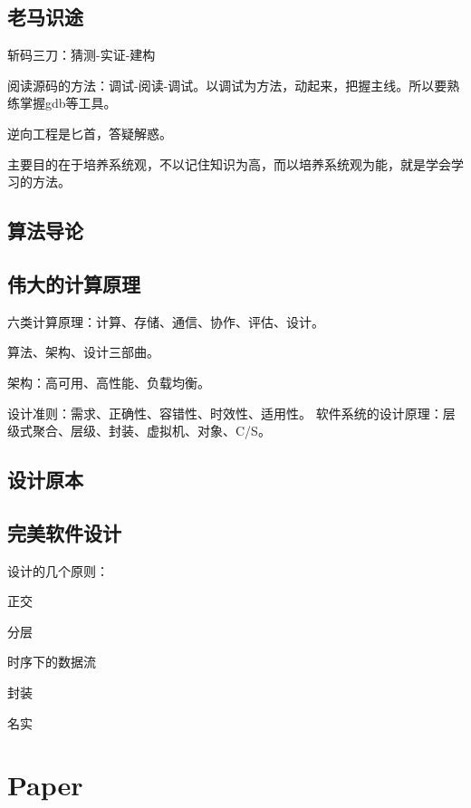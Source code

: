 \subsection{老马识途}

斩码三刀：猜测-实证-建构

阅读源码的方法：调试-阅读-调试。以调试为方法，动起来，把握主线。所以要熟练掌握gdb等工具。

逆向工程是匕首，答疑解惑。

主要目的在于培养系统观，不以记住知识为高，而以培养系统观为能，就是学会学习的方法。

\subsection{算法导论}

\subsection{伟大的计算原理}

六类计算原理：计算、存储、通信、协作、评估、设计。

算法、架构、设计三部曲。

架构：高可用、高性能、负载均衡。

设计准则：需求、正确性、容错性、时效性、适用性。
软件系统的设计原理：层级式聚合、层级、封装、虚拟机、对象、C/S。

\subsection{设计原本}

\subsection{完美软件设计}

设计的几个原则：
\begin{enumbox}
\item 正交
\item 分层
\item 时序下的数据流
\item 封装
\item 名实
\end{enumbox}

\section{Paper}
